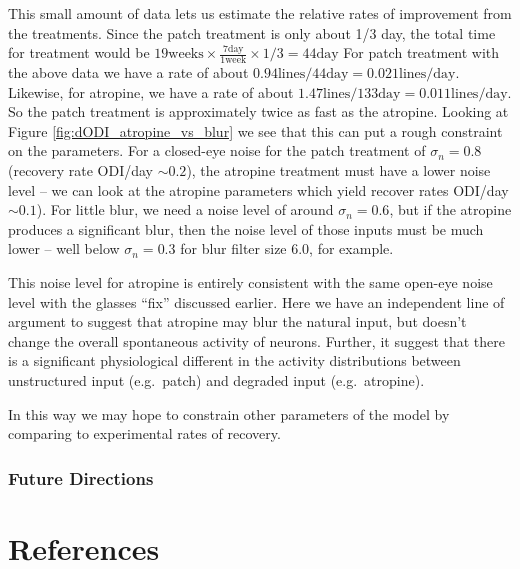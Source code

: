 \documentclass[
  onecolumn]{article}
\begin{document}
This small amount of data lets us estimate the relative rates of
improvement from the treatments. Since the patch treatment is only about
1/3 day, the total time for treatment would be
\(19 \text{weeks}\times \frac{7 \text{day}}{1 \text{week}}\times 1/3=44 \text{day}\)
For patch treatment with the above data we have a rate of about
\(0.94 \text{lines} / 44 \text{day}=0.021 \text{lines}/\text{day}\).
Likewise, for atropine, we have a rate of about
\(1.47\text{lines} / 133 \text{day}=0.011 \text{lines}/\text{day}\). So
the patch treatment is approximately twice as fast as the atropine.
Looking at Figure \ref{fig:dODI_atropine_vs_blur} we see that this can
put a rough constraint on the parameters. For a closed-eye noise for the
patch treatment of \(\sigma_n=0.8\) (recovery rate ODI/day
\(\sim 0.2\)), the atropine treatment must have a lower noise level --
we can look at the atropine parameters which yield recover rates ODI/day
\(\sim 0.1\)). For little blur, we need a noise level of around
\(\sigma_n=0.6\), but if the atropine produces a significant blur, then
the noise level of those inputs must be much lower -- well below
\(\sigma_n=0.3\) for blur filter size 6.0, for example.

This noise level for atropine is entirely consistent with the same
open-eye noise level with the glasses ``fix'' discussed earlier. Here we
have an independent line of argument to suggest that atropine may blur
the natural input, but doesn't change the overall spontaneous activity
of neurons. Further, it suggest that there is a significant
physiological different in the activity distributions between
unstructured input (e.g.~patch) and degraded input (e.g.~atropine).

In this way we may hope to constrain other parameters of the model by
comparing to experimental rates of recovery.

\hypertarget{future-directions}{%
\subsubsection{Future Directions}\label{future-directions}}

\hypertarget{references}{%
\section*{References}\label{references}}
\end{document}
